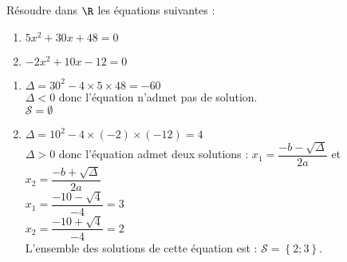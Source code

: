 \documentclass[a4paper,11pt,exos]{nsi} %
\begin{document}



\maketitle

\begin{exercice}
    Résoudre dans $\R$ les équations suivantes :
    \begin{multicols}{2}
        \begin{enumerate}
            \item $5x^2+30x+48=0$
	    \item $-2x^2+10x-12=0$
        \end{enumerate}
    \end{multicols}
    
\end{exercice}

\begin{enumerate}
    \item $\Delta = 30^2-4\times5\times48=-60$\\$\Delta<0$ donc l'équation n'admet pas de solution.\\$\mathcal{S}=\emptyset$
\item $\Delta = 10^2-4\times(-2)\times(-12)=4$\\$\Delta>0$ donc l'équation admet deux solutions : $x_1 = \dfrac{-b-\sqrt{\Delta}}{2a}$ et $x_2 = \dfrac{-b+\sqrt{\Delta}}{2a}$\\$x_1 =\dfrac{-10-\sqrt{4}}{-4}=3$\\$x_2 =\dfrac{-10+\sqrt{4}}{-4}=2$\\L'ensemble des solutions de cette équation est : $\mathcal{S}=\left\{2 ; 3\right\}$.
\end{enumerate}
\end{document}

